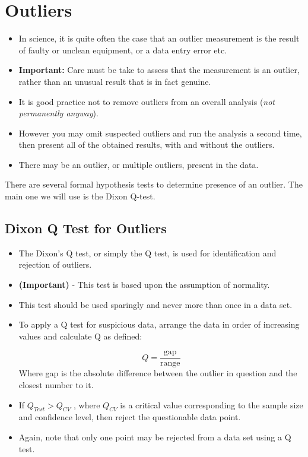 \documentclass[a4paper,12pt]{article}
\begin{document}
\newpage
\section*{Outliers}


\begin{itemize}
	\item In science, it is quite often the case that an outlier measurement is the result of faulty or unclean equipment, or a data entry error etc. 
	\item \textbf{Important:} Care must be take to assess that the measurement is an outlier, rather than an unusual result that is in fact genuine.
	\item It is good practice not to remove outliers from an overall analysis (\textit{not permanently anyway}). 
	\item However you may omit suspected outliers and run the analysis a second time, then present all of the obtained results, with and without the outliers.
	\item There may be an outlier, or multiple outliers, present in the data.
\end{itemize}

\noindent There are several formal hypothesis tests to determine presence of an outlier. The main one we will use is the Dixon Q-test.


\subsection*{Dixon Q Test for Outliers}
\begin{itemize}
	\item The Dixon's Q test, or simply the Q test, is used for identification and rejection of outliers. 
	\item \textbf{(Important)} - This test is based upon the assumption of normality. 
	\item This test should be used sparingly and never more than once in a data set. 
	\item To apply a Q test for suspicious data, arrange the data in order of increasing values and calculate Q as defined:
	
	\[ Q = \frac{\text{gap}}{\text{range}} \]
	Where gap is the absolute difference between the outlier in question and the closest number to it. 
		
		\item 	If $Q_{Test} > Q_{CV}$ , where $Q_{CV}$ is a critical value corresponding to the sample size and confidence level, then reject the questionable data point. 
		\item Again, note that only one point may be rejected from a data set using a Q test.
	
\end{itemize}
\end{document}
